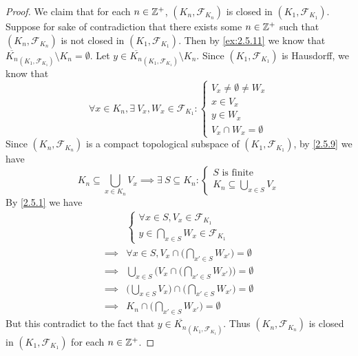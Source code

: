 \begin{proof}
  We claim that for each \(n \in \mathbb{Z}^+\), \((K_n, \mathcal{F}_{K_n})\) is closed in \((K_1, \mathcal{F}_{K_1})\).
  Suppose for sake of contradiction that there exists some \(n \in \mathbb{Z}^+\) such that \((K_n, \mathcal{F}_{K_n})\) is not closed in \((K_1, \mathcal{F}_{K_1})\).
  Then by \cref{ex:2.5.11} we know that \(\overline{K_n}_{(K_1, \mathcal{F}_{K_1})} \setminus K_n = \emptyset\).
  Let \(y \in \overline{K_n}_{(K_1, \mathcal{F}_{K_1})} \setminus K_n\).
  Since \((K_1, \mathcal{F}_{K_1})\) is Hausdorff, we know that
  \[
    \forall x \in K_n, \exists\ V_x, W_x \in \mathcal{F}_{K_1} : \begin{cases}
      V_x \neq \emptyset \neq W_x \\
      x \in V_x                   \\
      y \in W_x                   \\
      V_x \cap W_x = \emptyset
    \end{cases}
  \]
  Since \((K_n, \mathcal{F}_{K_n})\) is a compact topological subspace of \((K_1, \mathcal{F}_{K_1})\), by \cref{2.5.9} we have
  \[
    K_n \subseteq \bigcup_{x \in K_n} V_x \implies \exists\ S \subseteq K_n : \begin{cases}
      S \text{ is finite} \\
      K_n \subseteq \bigcup_{x \in S} V_x
    \end{cases}
  \]
  By \cref{2.5.1} we have
  \begin{align*}
             & \begin{cases}
                 \forall x \in S, V_x \in \mathcal{F}_{K_1} \\
                 y \in \bigcap_{x \in S} W_x \in \mathcal{F}_{K_1}
               \end{cases}                                         \\
    \implies & \forall x \in S, V_x \cap \bigg(\bigcap_{x' \in S} W_{x'}\bigg) = \emptyset              \\
    \implies & \bigcup_{x \in S} \Bigg(V_x \cap \bigg(\bigcap_{x' \in S} W_{x'}\bigg)\Bigg) = \emptyset \\
    \implies & \bigg(\bigcup_{x \in S} V_x\bigg) \cap \bigg(\bigcap_{x' \in S} W_{x'}\bigg) = \emptyset \\
    \implies & K_n \cap \bigg(\bigcap_{x' \in S} W_{x'}\bigg) = \emptyset
  \end{align*}
  But this contradict to the fact that \(y \in \overline{K_n}_{(K_1, \mathcal{F}_{K_1})}\).
  Thus \((K_n, \mathcal{F}_{K_n})\) is closed in \((K_1, \mathcal{F}_{K_1})\) for each \(n \in \mathbb{Z}^+\).


\end{proof}
